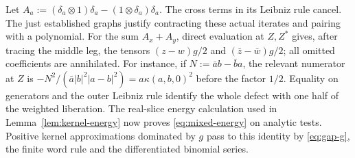 Let $A_a:=(\delta_a\otimes1)\delta_a-(1\otimes\delta_a)\delta_a$.
The cross terms in its Leibniz rule cancel.
The just established graphs justify contracting these actual iterates and pairing with a polynomial.
For the sum $A_x+A_y$, direct evaluation at $Z,Z^*$ gives, after tracing the middle leg, the tensors $(z-w)g/2$ and $(\bar z-\bar w)g/2$; all omitted coefficients are annihilated.
For instance, if $N:=\bar a b-\bar b a$, the relevant numerator at $Z$ is $-N^2/(\bar a|b|^2|a-b|^2)=a\kappa(a,b,0)^2$ before the factor $1/2$.
Equality on generators and the outer Leibniz rule identify the whole defect with one half of the weighted liberation.
The real-slice energy calculation used in Lemma~\ref{lem:kernel-energy} now proves \eqref{eq:mixed-energy} on analytic tests.
Positive kernel approximations dominated by $g$ pass to this identity by \eqref{eq:gap-g}, the finite word rule and the differentiated binomial series.

